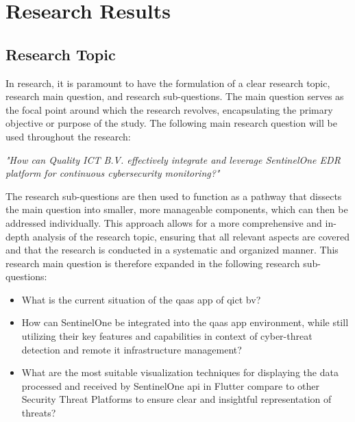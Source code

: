 \chapter{Research Results}
\begin{multicols}{2}
      \section{Research Topic}
      In research, it is paramount to have the formulation of a clear research topic, research main question,
      and research sub-questions. The main question serves as the focal point around which the research revolves,
      encapsulating the primary objective or purpose of the study.
      The following main research question will be used throughout the research:
      \begin{center}
            \textit{"How can Quality ICT B.V. effectively integrate and leverage SentinelOne EDR platform
                  for continuous cybersecurity monitoring?"}
      \end{center}
      The research sub-questions are then used to function as a pathway that dissects the main
      question into smaller, more manageable components, which can then be addressed individually. This approach
      allows for a more comprehensive and in-depth analysis of the research topic, ensuring that all relevant
      aspects are covered and that the research is conducted in a systematic and organized manner.
      This research main question is therefore expanded in the following research sub-questions:
      \begin{itemize}
            \item What is the current situation of the \acrshort{qaas} app of \acrlong{qict} \acrshort{bv}?
            \item How can SentinelOne be integrated into the \acrshort{qaas} app environment, while still
                  utilizing their key features and capabilities in context of cyber-threat detection and
                  remote \acrshort{it} infrastructure management?
            \item What are the most suitable visualization techniques for displaying the data processed and
                  received by  SentinelOne \acrshort{api} in Flutter compare to other Security Threat Platforms to
                  ensure clear and insightful representation of threats?
      \end{itemize}

\end{multicols}
